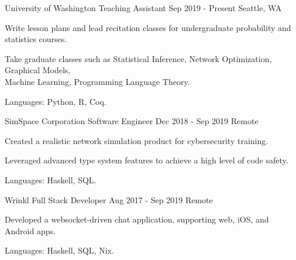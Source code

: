

\begin{cventries}

  \cventry
    {University of Washington}
    {Teaching Assistant}
    {Sep 2019 - Present}
    {Seattle, WA}
    {
      \begin{cvitems}
        \item Write lesson plans and lead recitation classes for undergraduate
          probability and statistics courses.
        \item Take graduate classes such as Statistical Inference, Network
          Optimization, Graphical Models,\\ Machine Learning, Programming Language
          Theory.
        \item Languages: Python, R, Coq.
      \end{cvitems}
    }

  \cventry
    {SimSpace Corporation}
    {Software Engineer}
    {Dec 2018 - Sep 2019}
    {Remote}
    {
      \begin{cvitems}
        \item Created a realistic network simulation product for cybersecurity
          training.
        \item Leveraged advanced type system features to achieve a high level of
          code safety.
        \item Languages: Haskell, SQL.
      \end{cvitems}
    }


  \cventry
    {Wrinkl}
    {Full Stack Developer}
    {Aug 2017 - Sep 2019}
    {Remote}
    {
      \begin{cvitems}
        \item Developed a websocket-driven chat application, supporting
          web, iOS, and Android apps.
        \item Languages: Haskell, SQL, Nix.
      \end{cvitems}
    }



\end{cventries}
